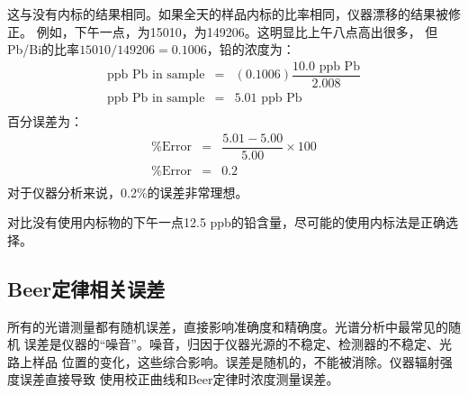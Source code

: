 这与没有内标的结果相同。如果全天的样品内标的比率相同，仪器漂移的结果被修正。
例如，下午一点，为15010，为149206。这明显比上午八点高出很多，
但Pb/Bi的比率$15010/149206=0.1006$，铅的浓度为：
\[
    \begin{array}{rcl}
        \text{ppb Pb in sample}&=&(0.1006)\dfrac{10.0\text{ ppb Pb}}{2.008}\\
        \text{ppb Pb in sample}&=&5.01\text{ ppb Pb}\\
    \end{array}
\]
百分误差为：
\[
    \begin{array}{rcl}
        \text{\% Error}&=&\dfrac{5.01-5.00}{5.00}\times 100\\
        \text{\% Error}&=&0.2\\
\end{array}
\]
对于仪器分析来说，0.2\%的误差非常理想。

对比没有使用内标物的下午一点12.5 ppb的铅含量，尽可能的使用内标法是正确选择。
\subsection{Beer定律相关误差}
所有的光谱测量都有随机误差，直接影响准确度和精确度。光谱分析中最常见的随机
误差是仪器的“噪音”。噪音，归因于仪器光源的不稳定、检测器的不稳定、光路上样品
位置的变化，这些综合影响。误差是随机的，不能被消除。仪器辐射强度误差直接导致
使用校正曲线和Beer定律时浓度测量误差。

